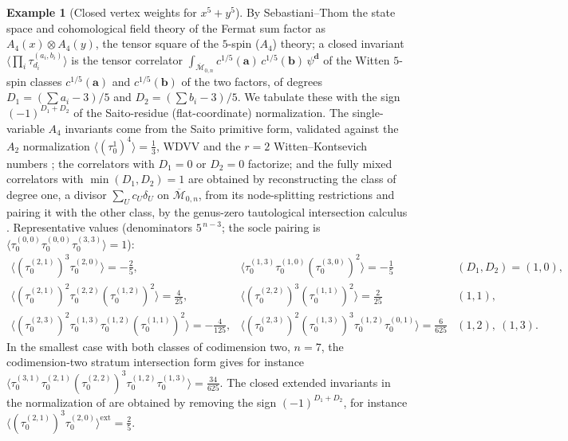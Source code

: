 \documentclass[11pt]{amsart}
\theoremstyle{definition}
\newtheorem{example}[theorem]{Example}
\theoremstyle{remark}
\newcommand{\Mbar}{\overline{\mathcal{M}}}
\begin{document}
\begin{example}[Closed vertex weights for $x^{5}+y^{5}$]
\label{ex:x5y5}
By Sebastiani--Thom \cite{FJR13} the state space and cohomological field theory of the Fermat
sum factor as $A_{4}(x)\otimes A_{4}(y)$, the tensor square of the $5$-spin
($A_{4}$) theory; a closed invariant
$\langle\prod_{i}\tau_{d_{i}}^{(a_{i},b_{i})}\rangle$ is the tensor correlator
$\int_{\Mbar_{0,n}}c^{1/5}(\mathbf a)\,c^{1/5}(\mathbf b)\,\psi^{\mathbf d}$ of
the Witten $5$-spin classes $c^{1/5}(\mathbf a)$ and $c^{1/5}(\mathbf b)$ of the
two factors, of degrees $D_{1}=(\sum a_{i}-3)/5$ and
$D_{2}=(\sum b_{i}-3)/5$. We tabulate these with the sign
$(-1)^{D_{1}+D_{2}}$ of the Saito-residue (flat-coordinate)
normalization.  The single-variable $A_{4}$ invariants come from the Saito
primitive form, validated against the $A_{2}$ normalization
$\langle(\tau_{0}^{1})^{4}\rangle=\tfrac13$, WDVV and the $r=2$
Witten--Kontsevich numbers \cite{Kontsevich92}; the correlators with
$D_{1}=0$ or $D_{2}=0$ factorize; and the fully mixed
correlators with $\min(D_{1},D_{2})=1$ are obtained by
reconstructing the class of degree one, a divisor $\sum_{U}c_{U}\delta_{U}$ on
$\Mbar_{0,n}$, from its node-splitting restrictions and pairing it with the
other class, by the genus-zero tautological intersection calculus
\cite{Keel92}.
Representative values (denominators $5^{\,n-3}$; the socle pairing is
$\langle\tau_{0}^{(0,0)}\tau_{0}^{(0,0)}\tau_{0}^{(3,3)}\rangle=1$):
\[
\renewcommand{\arraystretch}{1.4}
\begin{array}{lll}
\langle(\tau_{0}^{(2,1)})^{3}\tau_{0}^{(2,0)}\rangle=-\tfrac25, &
\langle\tau_{0}^{(1,3)}\tau_{0}^{(1,0)}(\tau_{0}^{(3,0)})^{2}\rangle=-\tfrac15
& (D_{1},D_{2})=(1,0),\\
\langle(\tau_{0}^{(2,1)})^{2}\tau_{0}^{(2,2)}(\tau_{0}^{(1,2)})^{2}\rangle
=\tfrac{4}{25}, &
\langle(\tau_{0}^{(2,2)})^{3}(\tau_{0}^{(1,1)})^{2}\rangle=\tfrac{2}{25}
& (1,1),\\
\langle(\tau_{0}^{(2,3)})^{2}\tau_{0}^{(1,3)}\tau_{0}^{(1,2)}
(\tau_{0}^{(1,1)})^{2}\rangle=-\tfrac{4}{125}, &
\langle(\tau_{0}^{(2,3)})^{2}(\tau_{0}^{(1,3)})^{3}\tau_{0}^{(1,2)}
\tau_{0}^{(0,1)}\rangle=\tfrac{6}{625}
& (1,2),\ (1,3).
\end{array}
\]
In the smallest case with both classes of codimension two, $n=7$, the
codimension-two stratum intersection form gives for instance
$\langle\tau_{0}^{(3,1)}\tau_{0}^{(2,1)}(\tau_{0}^{(2,2)})^{3}\tau_{0}^{(1,2)}
\tau_{0}^{(1,3)}\rangle=\tfrac{34}{625}$.  The
closed extended invariants in the normalization of \cite[Thm.~0.3]{GKT} are
obtained by removing the sign $(-1)^{D_1+D_2}$, for instance
$\langle(\tau_{0}^{(2,1)})^{3}\tau_{0}^{(2,0)}\rangle^{\mathrm{ext}}=\tfrac25$.
\end{example}
\end{document}
